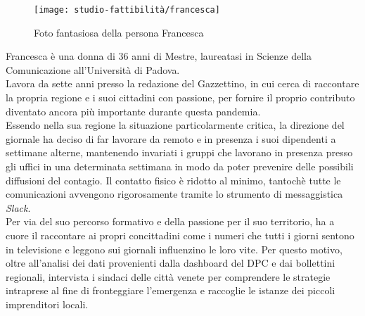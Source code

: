 \begin{wrapfigure}{l}{7cm}
    \texttt{[image: studio-fattibilità/francesca]}
    \caption{Foto fantasiosa della persona Francesca}
\end{wrapfigure}
        
Francesca è una donna di 36 anni di Mestre, laureatasi in Scienze della Comunicazione all'Università di Padova.\\ 
Lavora da sette anni presso la redazione del Gazzettino, in cui cerca di raccontare la propria regione e i suoi cittadini con passione, per fornire il proprio contributo diventato ancora più importante durante questa pandemia.\\ 
Essendo nella sua regione la situazione particolarmente critica, la direzione del giornale ha deciso di far lavorare da remoto e in presenza i suoi dipendenti a settimane alterne, mantenendo invariati i gruppi che lavorano in presenza presso gli uffici in una determinata settimana in modo da poter prevenire delle possibili diffusioni del contagio. Il contatto fisico è ridotto al minimo, tantochè tutte le comunicazioni avvengono rigorosamente tramite lo strumento di messaggistica \textit{Slack}.\\ 
Per via del suo percorso formativo e della passione per il suo territorio, ha a cuore il raccontare ai propri concittadini come i numeri che tutti i giorni sentono in televisione e leggono sui giornali influenzino le loro vite. Per questo motivo, oltre all'analisi dei dati provenienti dalla dashboard del DPC e dai bollettini regionali, intervista i sindaci delle città venete per comprendere le strategie intraprese al fine di fronteggiare l'emergenza e raccoglie le istanze dei piccoli imprenditori locali.

